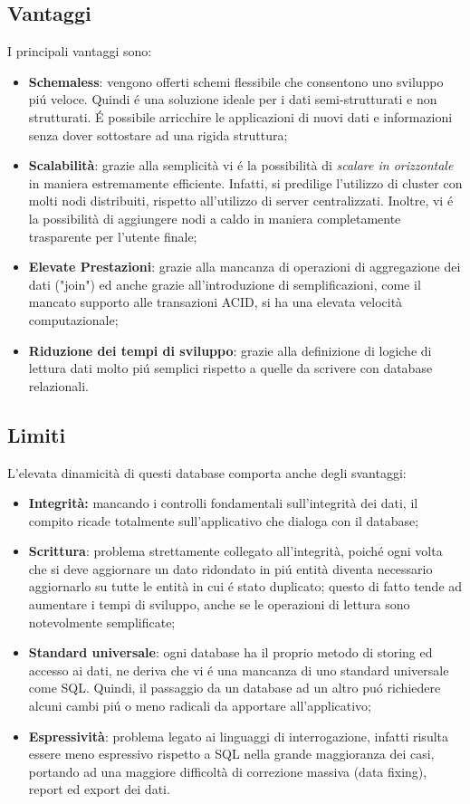 \subsection{Vantaggi}
I principali vantaggi sono:
\begin{itemize}
    \item \textbf{Schemaless}: vengono offerti schemi flessibile che consentono uno sviluppo piú veloce. Quindi é una soluzione ideale
    per i dati semi-strutturati e non strutturati. É possibile arricchire le applicazioni di nuovi dati e informazioni
    senza dover sottostare ad una rigida struttura;
    \item \textbf{Scalabilità}: grazie alla semplicità vi é la possibilità di \emph{scalare in orizzontale} in maniera estremamente
    efficiente. Infatti, si predilige l'utilizzo di cluster con molti nodi distribuiti, rispetto all'utilizzo di server centralizzati.
    Inoltre, vi é la possibilità di aggiungere nodi a caldo in maniera completamente trasparente per l'utente finale;
    \item \textbf{Elevate Prestazioni}: grazie alla mancanza di operazioni di aggregazione dei dati ("join") ed anche grazie
    all'introduzione di semplificazioni, come il mancato supporto alle transazioni ACID, si ha una elevata velocità computazionale;
    \item \textbf{Riduzione dei tempi di sviluppo}: grazie alla definizione di logiche di lettura dati molto piú semplici rispetto a quelle da scrivere con
    database relazionali.
\end{itemize}

\subsection{Limiti}
L'elevata dinamicità di questi database comporta anche degli svantaggi:
\begin{itemize}
    \item \textbf{Integrità:} mancando i controlli fondamentali sull'integrità dei dati, il compito ricade totalmente sull'applicativo che dialoga con il database;
    \item \textbf{Scrittura}: problema strettamente collegato all'integrità, poiché ogni volta che si deve aggiornare un dato ridondato in piú entità diventa
    necessario aggiornarlo su tutte le entità in cui é stato duplicato; questo di fatto tende ad aumentare i tempi di sviluppo, anche se le operazioni
    di lettura sono notevolmente semplificate;
    \item \textbf{Standard universale}: ogni database ha il proprio metodo di storing ed accesso ai dati, ne deriva che vi é una mancanza di uno standard
    universale come SQL. Quindi, il passaggio da un database ad un altro puó richiedere alcuni cambi piú o meno radicali da apportare all'applicativo;
    \item \textbf{Espressività}: problema legato ai linguaggi di interrogazione, infatti risulta essere meno espressivo rispetto a SQL nella grande maggioranza dei
    casi, portando ad una maggiore difficoltà di correzione massiva (data fixing), report ed export dei dati.

\end{itemize}

